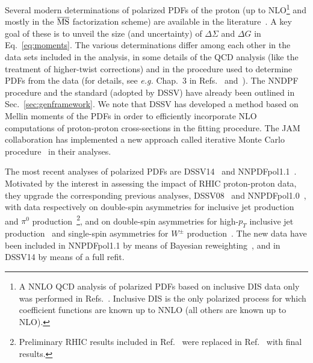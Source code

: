 Several modern determinations of polarized PDFs of the proton (up to 
NLO\footnote{A NNLO QCD analysis of polarized PDFs based on inclusive DIS
data only was performed in Refs.~\cite{Shahri:2016uzl,Khanpour:2017cha}.
Inclusive DIS is the only polarized process for which coefficient functions
are known up to NNLO (all others are known up to NLO).} 
and mostly in the $\overline{\rm MS}$ factorization scheme) are available in 
the literature~\cite{Nocera:2014gqa,Nocera:2016xhb,deFlorian:2014yva,deFlorian:2008mr,deFlorian:2009vb,Sato:2016tuz,Leader:2010rb,Blumlein:2010rn,Bourrely:2014uha,Hirai:2008aj}. 
%
A key goal of these is to unveil the size (and uncertainty) of
$\Delta\Sigma$ and  $\Delta G$ in Eq.~\eqref{eq:moments}. 
%
The various determinations differ among each other in the data sets included 
in the analysis, in some details of the QCD analysis (like the treatment of 
higher-twist corrections) and in the procedure used to determine PDFs from the 
data (for details, see {\it e.g.} Chap.~3 in Refs.~\cite{Nocera:2014vla} 
and~\cite{Nocera:2016xhb,Jimenez-Delgado:2013sma}). 
%
The NNDPF procedure and the standard (adopted by DSSV) have 
already been outlined in Sec.~\ref{sec:genframework}. 
%
We note that DSSV has developed a method based on Mellin moments of the PDFs 
in order to efficiently incorporate NLO computations
of proton-proton cross-sections in the fitting procedure. 
%
The JAM collaboration has implemented a new approach called 
iterative Monte Carlo procedure~\cite{Sato:2016tuz,Ethier:2017zbq}
in their analyses.

The most recent analyses of polarized PDFs are DSSV14~\cite{deFlorian:2014yva}
and NNPDFpol1.1~\cite{Nocera:2014gqa}.
%
Motivated by the interest in assessing the impact of RHIC proton-proton 
data, they upgrade the corresponding previous analyses, 
DSSV08~\cite{deFlorian:2008mr,deFlorian:2009vb} and 
NNPDFpol1.0~\cite{Ball:2013lla}, with data respectively on double-spin 
asymmetries for inclusive jet production~\cite{Adamczyk:2014ozi} 
and $\pi^0$ production~\cite{Adare:2014hsq}\footnote{Preliminary RHIC results 
included in Ref.~\cite{deFlorian:2008mr} were replaced in
Ref.~\cite{deFlorian:2014yva} with final results.}, 
and on double-spin asymmetries for high-$p_T$ inclusive jet 
production~\cite{Adamczyk:2014ozi,Adamczyk:2012qj,Adare:2010cc} and single-spin
asymmetries for $W^\pm$ production~\cite{Adamczyk:2014xyw}.
%
The new data have been included in NNPDFpol1.1 
by means of Bayesian reweighting~\cite{Ball:2010gb},
and in DSSV14 by means of a full refit.  

